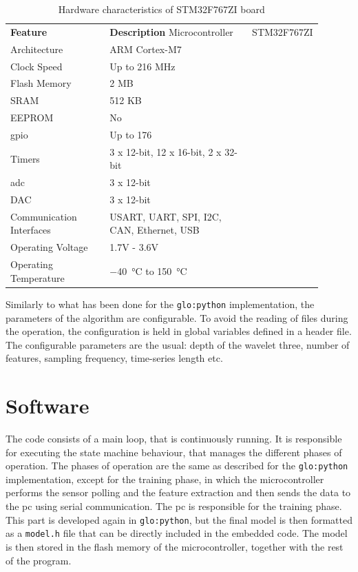 \begin{longtable}{p{0.35\linewidth}p{0.55\linewidth}}
    \caption{Hardware characteristics of STM32F767ZI board}    \label{tab:stm32f767zi}\\
    \toprule
    \textbf{Feature} & \textbf{Description} \endfirsthead 
    \hline
    Microcontroller & STM32F767ZI \\
    Architecture & ARM Cortex-M7 \\
    Clock Speed & Up to 216 MHz \\
    Flash Memory & 2 MB \\
    SRAM & 512 KB \\
    EEPROM & No \\
    \gls{gpio} & Up to 176 \\
    Timers & 3 x 12-bit, 12 x 16-bit, 2 x 32-bit \\
    \gls{adc} & 3 x 12-bit \\
    DAC & 3 x 12-bit \\
    Communication Interfaces & USART, UART, SPI, I2C, CAN, Ethernet, USB \\
    Operating Voltage & 1.7V - 3.6V \\
    Operating Temperature & \SI{-40}{\celsius} to \SI{+150}{\celsius} \\
    \bottomrule    
\end{longtable}

Similarly to what has been done for the \texttt{\gls{glo:python}} implementation, the parameters of the algorithm are configurable. To avoid the reading of files during the operation, the configuration is held in global variables defined in a header file. The configurable parameters are the usual: depth of the wavelet three, number of features, sampling frequency, time-series length etc.

\section{Software}
The code consists of a main loop, that is continuously running. It is responsible for executing the state machine behaviour, that manages the different phases of operation. The phases of operation are the same as described for the \texttt{\gls{glo:python}} implementation, except for the training phase, in which the microcontroller performs the sensor polling and the feature extraction and then sends the data to the \gls{pc} using serial communication. The \gls{pc} is responsible for the training phase. This part is developed again in \texttt{\gls{glo:python}}, but the final model is then formatted as a \texttt{model.h} file that can be directly included in the embedded code. The model is then stored in the flash memory of the microcontroller, together with the rest of the program.

